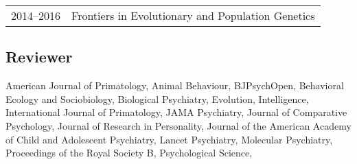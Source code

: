 \documentclass[11pt]{article}
\begin{document}
\begin{tabular}{p{3cm}p{12cm}}

2014--2016 & Frontiers in Evolutionary and Population Genetics 

\end{tabular}

\subsection*{Reviewer}

American Journal of Primatology, 
Animal Behaviour,
BJPsychOpen, 
Behavioral Ecology and Sociobiology, 
Biological Psychiatry, 
Evolution, 
Intelligence, 
International Journal of Primatology, 
JAMA Psychiatry, 
Journal of Comparative Psychology, 
Journal of Research in Personality, 
Journal of the American Academy of Child and Adolescent Psychiatry, 
Lancet Psychiatry, 
Molecular Psychiatry, 
Proceedings of the Royal Society B, 
Psychological Science, 
\end{document}
